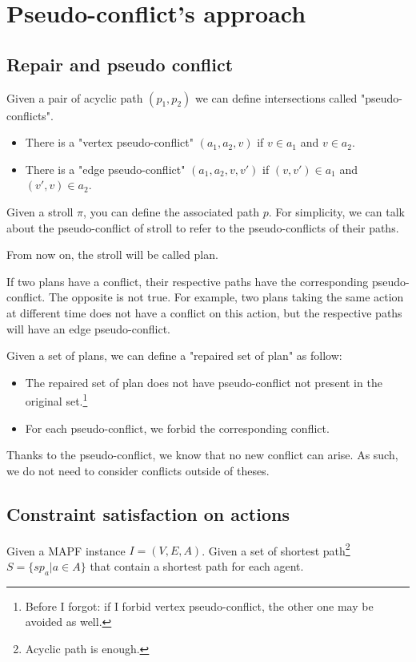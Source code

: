 \section{Pseudo-conflict's approach}\label{sec:pc}

\subsection{Repair and pseudo conflict}
Given a pair of acyclic path $(p_1,p_2)$ we can define intersections called "pseudo-conflicts".

\begin{itemize}
  \item There is a "vertex pseudo-conflict" $(a_1,a_2,v)$ if $v \in a_1$ and $v \in a_2$.
  \item There is a "edge pseudo-conflict" $(a_1,a_2,v,v')$ if $(v,v') \in a_1$ and $(v',v) \in a_2$.
\end{itemize}

Given a stroll $\pi$, you can define the associated path $p$. For simplicity, we can talk about the pseudo-conflict of stroll to refer to the pseudo-conflicts of their paths.

From now on, the stroll will be called plan.

If two plans have a conflict, their respective paths have the corresponding pseudo-conflict. The opposite is not true. For example, two plans taking the same action at different time does not have a conflict on this action, but the respective paths will have an edge pseudo-conflict.

Given a set of plans, we can define a "repaired set of plan" as follow:
\begin{itemize}
  \item The repaired set of plan does not have pseudo-conflict not present in the original set.\footnote{Before I forgot: if I forbid vertex pseudo-conflict, the other one may be avoided as well.}
  \item For each pseudo-conflict, we forbid the corresponding conflict.
\end{itemize}
Thanks to the pseudo-conflict, we know that no new conflict can arise. As such, we do not need to consider conflicts outside of theses.

\subsection{Constraint satisfaction on actions}
Given a MAPF instance $I=(V,E,A)$.
Given a set of shortest path\footnote{Acyclic path is enough.} $S = \{sp_a | a \in A \}$ that contain a shortest path for each agent.

